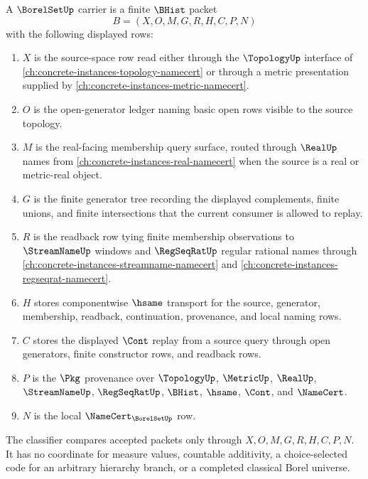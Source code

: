 \begin{definition}
\label{def:borel-set-carrier}
A $\BorelSetUp$ carrier is a finite $\BHist$ packet
$$
B=(X,O,M,G,R,H,C,P,N)
$$
with the following displayed rows:
\begin{enumerate}
\item $X$ is the source-space row read either through the $\TopologyUp$ interface of \autoref{ch:concrete-instances-topology-namecert} or through a metric presentation supplied by \autoref{ch:concrete-instances-metric-namecert}.
\item $O$ is the open-generator ledger naming basic open rows visible to the source topology.
\item $M$ is the real-facing membership query surface, routed through $\RealUp$ names from \autoref{ch:concrete-instances-real-namecert} when the source is a real or metric-real object.
\item $G$ is the finite generator tree recording the displayed complements, finite unions, and finite intersections that the current consumer is allowed to replay.
\item $R$ is the readback row tying finite membership observations to $\StreamNameUp$ windows and $\RegSeqRatUp$ regular rational names through \autoref{ch:concrete-instances-streamname-namecert} and \autoref{ch:concrete-instances-regseqrat-namecert}.
\item $H$ stores componentwise $\hsame$ transport for the source, generator, membership, readback, continuation, provenance, and local naming rows.
\item $C$ stores the displayed $\Cont$ replay from a source query through open generators, finite constructor rows, and readback rows.
\item $P$ is the $\Pkg$ provenance over $\TopologyUp$, $\MetricUp$, $\RealUp$, $\StreamNameUp$, $\RegSeqRatUp$, $\BHist$, $\hsame$, $\Cont$, and $\NameCert$.
\item $N$ is the local $\NameCert_{\BorelSetUp}$ row.
\end{enumerate}
The classifier compares accepted packets only through $X,O,M,G,R,H,C,P,N$. It has no coordinate for measure values, countable additivity, a choice-selected code for an arbitrary hierarchy branch, or a completed classical Borel universe.
\end{definition}


